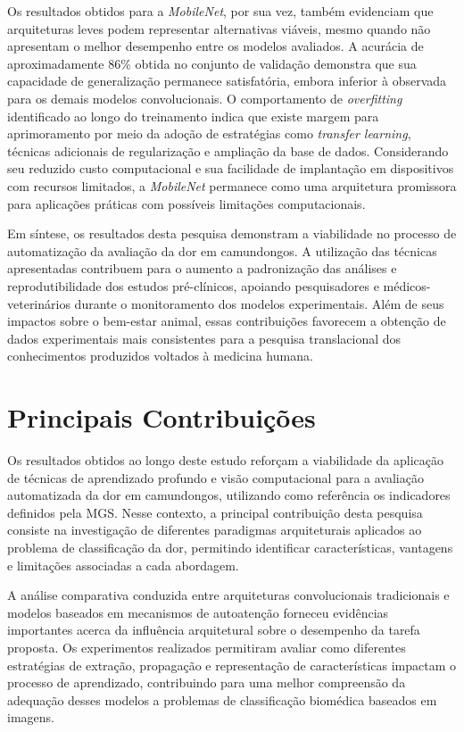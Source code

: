 Os resultados obtidos para a \textit{MobileNet}, por sua vez, também evidenciam que arquiteturas leves podem representar alternativas viáveis, mesmo quando não apresentam o melhor desempenho entre os modelos avaliados. A acurácia de aproximadamente 86\% obtida no conjunto de validação demonstra que sua capacidade de generalização permanece satisfatória, embora inferior à observada para os demais modelos convolucionais. O comportamento de \textit{overfitting} identificado ao longo do treinamento indica que existe margem para aprimoramento por meio da adoção de estratégias como \textit{transfer learning}, técnicas adicionais de regularização e ampliação da base de dados. Considerando seu reduzido custo computacional e sua facilidade de implantação em dispositivos com recursos limitados, a \textit{MobileNet} permanece como uma arquitetura promissora para aplicações práticas com possíveis limitações computacionais.

Em síntese, os resultados desta pesquisa demonstram a viabilidade no processo de automatização da avaliação da dor em camundongos. A utilização das técnicas apresentadas contribuem para o aumento a padronização das análises e reprodutibilidade dos estudos pré-clínicos, apoiando pesquisadores e médicos-veterinários durante o monitoramento dos modelos experimentais. Além de seus impactos sobre o bem-estar animal, essas contribuições favorecem a obtenção de dados experimentais mais consistentes para a pesquisa translacional  dos conhecimentos produzidos voltados à medicina humana.

\section{Principais Contribuições}

Os resultados obtidos ao longo deste estudo reforçam a viabilidade da aplicação de técnicas de aprendizado profundo e visão computacional para a avaliação automatizada da dor em camundongos, utilizando como referência os indicadores definidos pela \acs{MGS}. Nesse contexto, a principal contribuição desta pesquisa consiste na investigação de diferentes paradigmas arquiteturais aplicados ao problema de classificação da dor, permitindo identificar características, vantagens e limitações associadas a cada abordagem.

A análise comparativa conduzida entre arquiteturas convolucionais tradicionais e modelos baseados em mecanismos de autoatenção forneceu evidências importantes acerca da influência arquitetural sobre o desempenho da tarefa proposta. Os experimentos realizados permitiram avaliar como diferentes estratégias de extração, propagação e representação de características impactam o processo de aprendizado, contribuindo para uma melhor compreensão da adequação desses modelos a problemas de classificação biomédica baseados em imagens.

